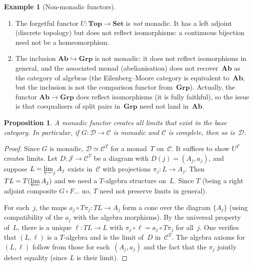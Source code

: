 \documentclass[a4paper,12pt]{book}
\newcommand{\Set}{\mathbf{Set}}
\newcommand{\Grp}{\mathbf{Grp}}
\newcommand{\Ab}{\mathbf{Ab}}
\newcommand{\Top}{\mathbf{Top}}
\theoremstyle{definition}
\newtheorem{example}[definition]{Example}
\theoremstyle{plain}
\newtheorem{proposition}[definition]{Proposition}
\theoremstyle{remark}
\begin{document}
\begin{example}[Non-monadic functors]\label{ex:non-monadic}
\begin{enumerate}[label=(\roman*)]
\item The forgetful functor $U\colon\Top\to\Set$ is \emph{not} monadic.
    It has a left adjoint (discrete topology) but does not reflect
    isomorphisms: a continuous bijection need not be a homeomorphism.

\item The inclusion $\Ab\hookrightarrow\Grp$ is not monadic:
    it does not reflect isomorphisms in general, and the associated
    monad (abelianisation) does not recover~$\Ab$ as the category of
    algebras (the Eilenberg--Moore category is equivalent to~$\Ab$,
    but the inclusion is not the comparison functor from~$\Grp$).
    Actually, the functor $\Ab\to\Grp$ does reflect isomorphisms
    (it is fully faithful), so the issue is that coequalisers of
    split pairs in~$\Grp$ need not land in~$\Ab$.
\end{enumerate}
\end{example}

\begin{proposition}\label{prop:monadic-creates-limits}
A monadic functor creates all limits that exist in the base category.
In particular, if $G\colon\mathcal{D}\to\mathcal{C}$ is monadic
and $\mathcal{C}$ is complete, then so is~$\mathcal{D}$.
\end{proposition}

\begin{proof}
Since $G$ is monadic, $\mathcal{D}\simeq\mathcal{C}^T$ for a
monad~$T$ on~$\mathcal{C}$.  It suffices to show $U^T$ creates limits.
Let $D\colon\mathcal{J}\to\mathcal{C}^T$ be a diagram with
$D(j) = (A_j,a_j)$, and suppose $L = \varprojlim_j A_j$ exists
in~$\mathcal{C}$ with projections $\pi_j\colon L\to A_j$.
Then $TL = T(\varprojlim A_j)$ and we need a $T$-algebra structure
on~$L$.  Since $T$ (being a right adjoint composite $G\circ F$... no,
$T$ need not preserve limits in general).

For each~$j$, the maps $a_j\circ T\pi_j\colon TL\to A_j$ form a cone
over the diagram $\{A_j\}$ (using compatibility of the $a_j$ with
the algebra morphisms).  By the universal property of~$L$, there is a
unique $\ell\colon TL\to L$ with $\pi_j\circ\ell = a_j\circ T\pi_j$
for all~$j$.  One verifies that $(L,\ell)$ is a $T$-algebra and is
the limit of~$D$ in~$\mathcal{C}^T$.  The algebra axioms for~$(L,\ell)$
follow from those for each~$(A_j,a_j)$ and the fact that the $\pi_j$
jointly detect equality (since $L$ is their limit).
\end{proof}
\end{document}
